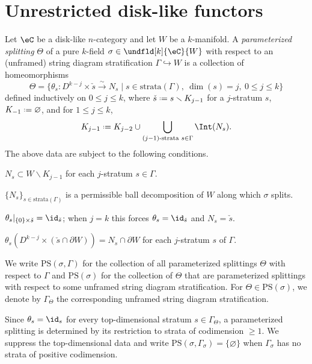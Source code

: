 \documentclass[12pt,reqno]{amsart}
\newcommand{\C}{\eC}
\newcommand{\defn}[1]{\emph{#1}}
\renewcommand{\setminus}{\smallsetminus}
\DeclareRobustCommand{\coloneq}{\mathrel{\vcenter{\baselineskip0.5ex\lineskiplimit0pt\hbox{\scriptsize{\upshape.}}\hbox{\scriptsize{\upshape.}}}}=}
\begin{document}
\section{Unrestricted disk-like functors}
\label{sec:unnrestricted}
\begin{definition}
\label{def:parameterized-splitting-filtered}
Let $\C$ be a disk-like $n$-category and let $W$ be a $k$-manifold.
A \defn{parameterized splitting} $\Theta$ of a pure $k$-field $\sigma\in\undfld[k]{\C}{W}$ with respect to an (unframed) string diagram stratification $\Gamma\hookrightarrow W$ is a collection of homeomorphisms
\[
  \Theta=\{\theta_s\colon D^{k-j}\times \check{s}\overset\sim\to N_s \mid s\in\mathrm{strata}(\Gamma),\ \dim(s)=j,\ 0\leq j\leq k\}
\]
defined inductively on $0\leq j\leq k$, where $\check{s}\coloneq s\setminus K_{j-1}$ for a $j$-stratum $s$, $K_{-1}\coloneq\varnothing$, and for $1\leq j\leq k$,
\[
K_{j-1}\coloneq
K_{j-2}\cup\bigcup_{\substack{(j-1)\text{-strata }s\in\Gamma}}\Int(N_s).
\]
The above data are subject to the following conditions.
\begin{lst}
  \item[($\Theta$1)] $N_s\subset W\setminus K_{j-1}$ for each $j$-stratum $s\in\Gamma$.
  \item[($\Theta$2)]\label{axiom:Theta-split} $\{N_s\}_{s\in\mathrm{strata}(\Gamma)}$ is a permissible ball decomposition of $W$ along which $\sigma$ splits.
  \item[($\Theta$3)]\label{axiom:Theta-core} $\theta_s|_{\{0\}\times\check{s}}=\id_{\check{s}}$; when $j=k$ this forces $\theta_s=\id_{\check{s}}$ and $N_s=\check{s}$.
  \item[($\Theta$4)]\label{axiom:Theta-bdy-compat} $\theta_s(D^{k-j}\times(\check{s}\cap\partial W))=N_s\cap\partial W$ for each $j$-stratum $s$ of $\Gamma$.
\end{lst}
\end{definition}

We write $\mathrm{PS}(\sigma,\Gamma)$ for the collection of all parameterized splittings $\Theta$ with respect to $\Gamma$ and $\mathrm{PS}(\sigma)$ for the collection of $\Theta$ that are parameterized splittings with respect to some unframed string diagram stratification. For $\Theta\in\mathrm{PS}(\sigma)$, we denote by $\Gamma_\Theta$ the corresponding unframed string diagram stratification.


\begin{notation}
Since $\theta_s=\id_s$ for every top-dimensional stratum $s\in\Gamma_\Theta$, a parameterized splitting is determined by its restriction to strata of codimension $\geq 1$. We suppress the top-dimensional data and write $\mathrm{PS}(\sigma,\Gamma_\sigma)=\{\varnothing\}$ when $\Gamma_\sigma$ has no strata of positive codimension.
\end{notation}
\end{document}
